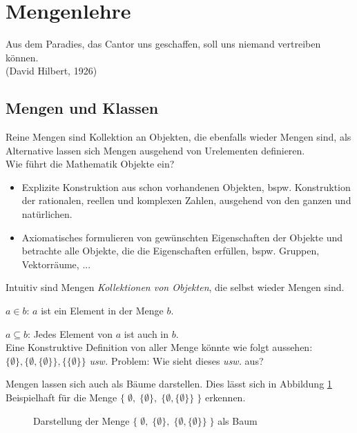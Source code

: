 \section{Mengenlehre}

\glqq Aus dem Paradies, das Cantor uns geschaffen, soll uns niemand vertreiben können.\grqq{}\\
(David Hilbert, 1926) 

\subsection{Mengen und Klassen}

Reine Mengen sind Kollektion an Objekten, die ebenfalls wieder Mengen sind, als Alternative lassen sich Mengen ausgehend von Urelementen definieren.
\\
Wie führt die Mathematik Objekte ein?
\begin{itemize}
	\item Explizite Konstruktion aus schon vorhandenen Objekten, bspw. Konstruktion der rationalen, reellen und komplexen Zahlen, ausgehend von den ganzen und natürlichen.
	\item Axiomatisches formulieren von gewünschten Eigenschaften der Objekte und betrachte alle Objekte, die die Eigenschaften erfüllen, bspw. Gruppen, Vektorräume, ...
\end{itemize}

\begin{definition}[Mengen]
	Intuitiv sind Mengen \textit{Kollektionen von Objekten}, die selbst wieder Mengen sind. 
	
	$a\in b$: $a$ ist ein Element in der Menge $b$.
	
	$a \subseteq b$: Jedes Element von $a$ ist auch in $b$.
	\\
	Eine Konstruktive Definition von aller Menge könnte wie folgt aussehen:\\ $\{\emptyset\}, \{\emptyset,\{\emptyset\}\}, \{\{\emptyset\}\}$ \textit{usw.}
	Problem: Wie sieht dieses \textit{usw.} aus?
\end{definition}


Mengen lassen sich auch als Bäume darstellen. Dies lässt sich in Abbildung \ref{Mengenbaum} Beispielhaft für die Menge $\{\; \emptyset, \; \{\emptyset\}, \; \{\emptyset,\{\emptyset\}\}\;\}$ erkennen. 

\begin{figure}[h]
	\begin{center}
	\end{center}
\caption{Darstellung der Menge $\{\; \emptyset, \; \{\emptyset\}, \; \{\emptyset,\{\emptyset\}\}\;\}$ als Baum}
\label{Mengenbaum}
\end{figure}

